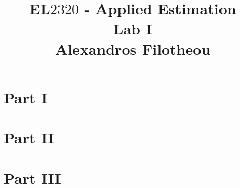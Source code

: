 \documentclass[12pt]{article}
\title{EL$2320$ - Applied Estimation \\ Lab I \\ Alexandros Filotheou}
\date{}
\begin{document}
	\maketitle
	

	\section{Part I}
			
		\newpage
		
		
	\section{Part II}
			
		\newpage
	
	\section{Part III}
		
			
\end{document}

